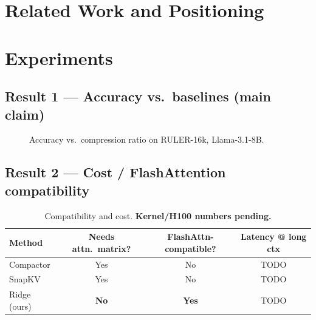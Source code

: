 \documentclass{article}
\begin{document}
\section{Related Work and Positioning}
\label{sec:related}

\section{Experiments}
\label{sec:experiments}

\subsection{Result 1 --- Accuracy vs.\ baselines (main claim)}
\label{sec:res-accuracy}
\begin{figure}[t]
  \centering
  \caption{Accuracy vs.\ compression ratio on RULER-16k, Llama-3.1-8B.}
  \label{fig:accuracy}
\end{figure}

\subsection{Result 2 --- Cost / FlashAttention compatibility}
\label{sec:res-cost}
\begin{table}[t]
  \centering
  \caption{Compatibility and cost. \textbf{Kernel/H100 numbers pending.}}
  \label{tab:cost}
  \begin{tabular}{lccc}
    \toprule
    Method & Needs attn.\ matrix? & FlashAttn-compatible? & Latency @ long ctx \\
    \midrule
    Compactor & Yes & No  & TODO \\
    SnapKV    & Yes & No  & TODO \\
    Ridge (ours) & \textbf{No} & \textbf{Yes} & TODO \\
    \bottomrule
  \end{tabular}
\end{table}
\end{document}
